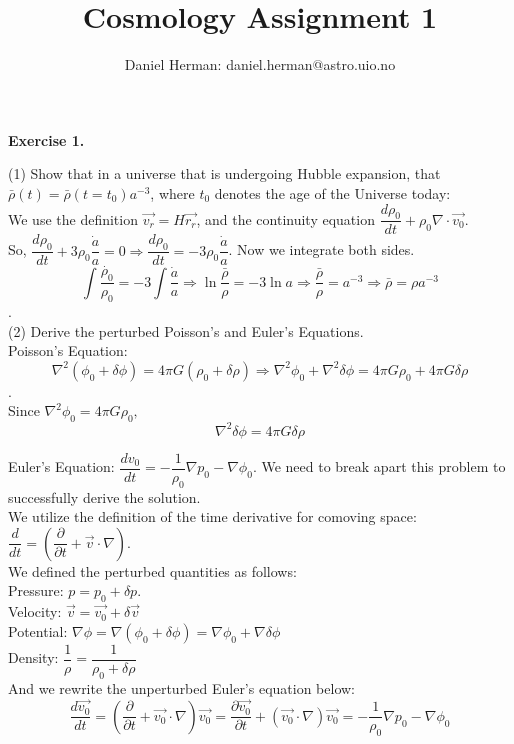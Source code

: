 \documentclass[a4paper]{article}
\title{Cosmology Assignment 1}
\author{Daniel Herman: daniel.herman@astro.uio.no}
\begin{document}
\begin{titlepage}
\maketitle
\end{titlepage}

\textbf{Exercise 1.}

\noindent (1) Show that in a universe that is undergoing Hubble expansion, that $\bar{\rho}(t)=\bar{\rho}(t=t_0)a^{-3}$, where $t_0$ denotes the age of the Universe today:\\

We use the definition $\vec{v_r} = H \vec{r_r}$, and the continuity equation $\dfrac{d\rho_0}{dt} + \rho_0 \nabla \cdot \vec{v_0}.$\\

So, $\dfrac{d\rho_0}{dt} + 3\rho_0 \dfrac{\dot{a}}{a} = 0 \Rightarrow \dfrac{d\rho_0}{dt} = -3\rho_0 \dfrac{\dot{a}}{a}$. Now we integrate both sides.\\
$$\int \dfrac{\dot{\rho_0}}{\rho_0} = -3 \int \dfrac{\dot{a}}{a} \Rightarrow \ln \dfrac{\bar{\rho}}{\rho} = -3 \ln a \Rightarrow \dfrac{\bar{\rho}}{\rho} = a^{-3} \Rightarrow \bar{\rho} = \rho a^{-3} $$.\\

\noindent (2) Derive the perturbed Poisson's and Euler's Equations.\\
Poisson's Equation: $$ \nabla^2(\phi_0 + \delta\phi) = 4 \pi G(\rho_0 + \delta\rho) \Rightarrow \nabla^2\phi_0 + \nabla^2\delta\phi = 4 \pi G \rho_0 + 4 \pi G \delta \rho$$.\\ Since $\nabla^2\phi_0 = 4 \pi G \rho_0,$ 
\begin{equation}
\nabla^2\delta\phi = 4 \pi G \delta \rho
\label{eq:1}
\end{equation}

\noindent Euler's Equation: $ \dfrac{dv_0}{dt} = -\dfrac{1}{\rho_0} \nabla p_0 - \nabla \phi_0$. We need to break apart this problem to successfully derive the solution.\\
We utilize the definition of the time derivative for comoving space: $\dfrac{d}{dt} = (\dfrac{\partial}{\partial t} + \vec{v}\cdot \nabla)$.\\
\noindent We defined the perturbed quantities as follows:\\ Pressure: $p = p_0 + \delta p.$ \\
Velocity: $\vec{v} = \vec{v_0} + \delta\vec{v}$\\
Potential: $\nabla \phi = \nabla (\phi_0 + \delta \phi) = \nabla \phi_0 + \nabla \delta \phi$\\ 
Density: $\dfrac{1}{\rho} = \dfrac{1}{\rho_0 + \delta \rho}$\\ 
And we rewrite the unperturbed Euler's equation below:
\begin{equation}
\dfrac{d\vec{v_0}}{dt} = (\dfrac{\partial}{\partial t} + \vec{v_0} \cdot \nabla) \vec{v_0} = \dfrac{\partial \vec{v_0}}{\partial t} + (\vec{v_0} \cdot \nabla) \vec{v_0}  = -\dfrac{1}{\rho_0} \nabla p_0 - \nabla \phi_0
\label{eq:2}
\end{equation}
\end{document}
